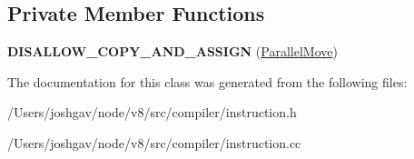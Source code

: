 \subsection*{Private Member Functions}
\begin{DoxyCompactItemize}
\item 
{\bfseries D\+I\+S\+A\+L\+L\+O\+W\+\_\+\+C\+O\+P\+Y\+\_\+\+A\+N\+D\+\_\+\+A\+S\+S\+I\+GN} (\hyperlink{classv8_1_1internal_1_1compiler_1_1_parallel_move}{Parallel\+Move})\hypertarget{classv8_1_1internal_1_1compiler_1_1_parallel_move_a35d03a958b77c2beded3131c0724cff8}{}\label{classv8_1_1internal_1_1compiler_1_1_parallel_move_a35d03a958b77c2beded3131c0724cff8}

\end{DoxyCompactItemize}


The documentation for this class was generated from the following files\+:\begin{DoxyCompactItemize}
\item 
/\+Users/joshgav/node/v8/src/compiler/instruction.\+h\item 
/\+Users/joshgav/node/v8/src/compiler/instruction.\+cc\end{DoxyCompactItemize}
